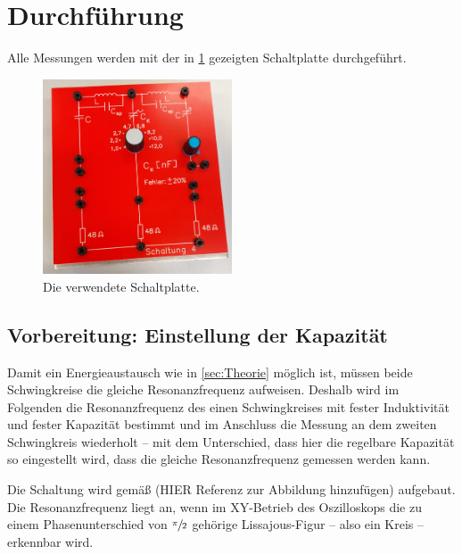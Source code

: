 \section{Durchführung}
\label{sec:Durchführung}

Alle Messungen werden mit der in \ref{fig:platte}
gezeigten Schaltplatte durchgeführt. 
\begin{figure}
    \centering
    \includegraphics[width=0.5\textwidth]{plots/Platte.jpeg}
    \caption{Die verwendete Schaltplatte.}
    \label{fig:platte}
\end{figure}

\subsection{Vorbereitung: Einstellung der Kapazität}
Damit ein Energieaustausch wie in \ref{sec:Theorie} möglich ist, müssen beide Schwingkreise die gleiche Resonanzfrequenz 
aufweisen. 
Deshalb wird im Folgenden die Resonanzfrequenz des einen Schwingkreises mit fester Induktivität und fester Kapazität bestimmt 
und im Anschluss die Messung an dem zweiten Schwingkreis wiederholt -- mit dem Unterschied, dass hier die regelbare Kapazität so
eingestellt wird, dass die gleiche Resonanzfrequenz gemessen werden kann. 

Die Schaltung wird gemäß (HIER Referenz zur Abbildung hinzufügen) aufgebaut. 
Die Resonanzfrequenz liegt an, wenn im XY-Betrieb des Oszilloskops die zu einem Phasenunterschied von $\sfrac{\pi}{2}$ 
gehörige Lissajous-Figur --  also ein Kreis -- erkennbar wird.

